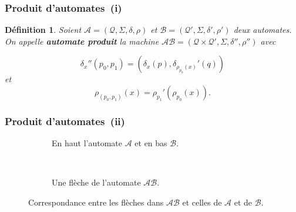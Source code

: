 \documentclass[11pt]{beamer}
\newtheorem{defi}{Définition}
\begin{document}
\begin{frame}
  \frametitle{Produit d'automates~(i)}
  \begin{defi}
    Soient $\mathcal{A} = \left(\mathcal{Q}, \Sigma, \delta, \rho\right)$ et $\mathcal{B} = \left(\mathcal{Q'}, \Sigma, \delta', \rho'\right)$ deux automates. On appelle \textbf{\textit{automate produit}} la machine $\mathcal{AB} = \left(\mathcal{Q}\times\mathcal{Q'}, \Sigma, \delta'', \rho''\right)$ avec

    \[ \delta_x''(p_0, p_1) = (\delta_x(p), \delta_{\rho_{p_0}(x)}'(q))\]
    et
    \[ \rho_{(p_0,p_1)}(x) = \rho_{p_1}'(\rho_{p_0}(x)). \]
  \end{defi}
\end{frame}

\begin{frame}
  \frametitle{Produit d'automates~(ii)}
  \begin{figure}[h!]
    \begin{subfigure}[b]{0.35\textwidth}
      \centering
      \caption{En haut l'automate $\mathcal{A}$ et en bas $\mathcal{B}$.}
    \end{subfigure}
    ~
    \begin{subfigure}[b]{0.35\textwidth}
      \centering
      \caption{Une flèche de l'automate $\mathcal{AB}$.}
    \end{subfigure}
    \caption{Correspondance entre les flèches dans $\mathcal{AB}$ et celles de $\mathcal{A}$ et de $\mathcal{B}$.}
  \end{figure}
\end{frame}
\end{document}
